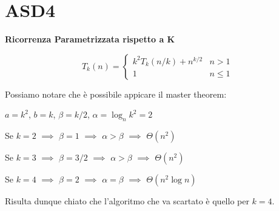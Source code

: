 \documentclass[../cheatSheetAlgoritmi.tex]{subfiles}
\begin{document}
\section{ASD4}
\textbf{Ricorrenza Parametrizzata rispetto a K}
\begin{center}
	\begin{equation*}
  		T_{k}(n)=\begin{cases}
    		k^{2}T_{k}(n/k) + n^{k/2}  & \text{$n > 1$}\\
    		1 & \text{$n \leq 1$}
  		\end{cases}
	\end{equation*}
\end{center}
Possiamo notare che è possibile appicare il master theorem:

$a = k^{2}$, $b = k$, $\beta = k/2$, $\alpha = \log_{n}{k^{2}}= 2$

Se $k = 2$ $\implies$ $\beta = 1$ $\implies$ $\alpha > \beta$ $\implies$ $\Theta(n^{2})$

Se $k = 3$ $\implies$ $\beta = 3/2$ $\implies$ $\alpha > \beta$ $\implies$ $\Theta(n^{2})$

Se $k = 4$ $\implies$ $\beta = 2$ $\implies$ $\alpha = \beta$ $\implies$ $\Theta(n^{2}\log{n})$

Risulta dunque chiato che l'algoritmo che va scartato è quello per $k = 4$.
\end{document}

